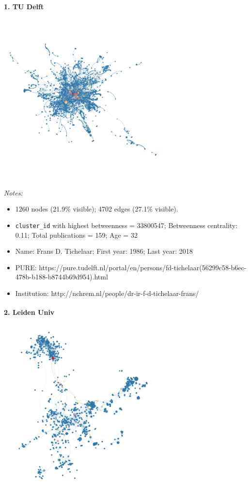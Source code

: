 \documentclass[]{elsarticle} %
\providecommand{\tightlist}{%
  \setlength{\itemsep}{0pt}\setlength{\parskip}{0pt}}
\begin{document}
\hypertarget{tu-delft}{%
\paragraph{1. TU Delft}\label{tu-delft}}

\includegraphics[width=3.41in]{figs/tu_phys_betweenness}

\emph{Notes:}

\begin{itemize}
\tightlist
\item
  1260 nodes (21.9\% visible); 4702 edges (27.1\% visible).
\item
  \texttt{cluster\_id} with highest betweenness = 33800547; Betweenness
  centrality: 0.11; Total publications = 159; Age = 32
\item
  Name: Frans D. Tichelaar; First year: 1986; Last year: 2018
\item
  PURE:
  https://pure.tudelft.nl/portal/en/persons/fd-tichelaar(56299c58-b6ec-478b-b188-b8744b69d954).html
\item
  Institution: http://nchrem.nl/people/dr-ir-f-d-tichelaar-frans/
\end{itemize}

\hypertarget{leiden-univ}{%
\paragraph{2. Leiden Univ}\label{leiden-univ}}

\includegraphics[width=3.41in]{figs/lu_phys_betweenness}
\end{document}
